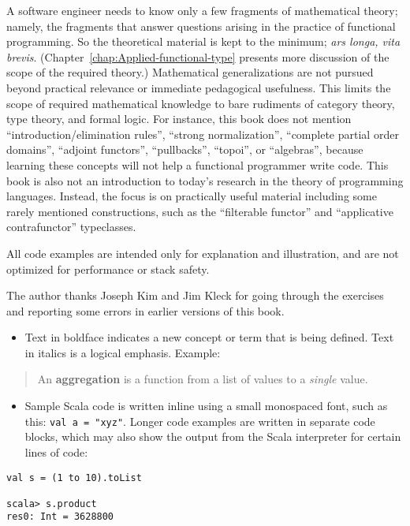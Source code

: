 A software engineer needs to know only a few fragments of mathematical
theory; namely, the fragments that answer questions arising in the
practice of functional programming. So the theoretical material is
kept to the minimum; \emph{ars longa, vita brevis}. (Chapter~\ref{chap:Applied-functional-type}
presents more discussion of the scope of the required theory.) Mathematical
generalizations are not pursued beyond practical relevance or immediate
pedagogical usefulness. This limits the scope of required mathematical
knowledge to bare rudiments of category theory, type theory, and formal
logic. For instance, this book does not mention ``introduction/elimination
rules'', ``strong normalization'', ``complete partial order domains'',
``adjoint functors'', ``pullbacks'', ``topoi'', or ``algebras'',
because learning these concepts will not help a functional programmer
write code. This book is also not an introduction to today's research
in the theory of programming languages. Instead, the focus is on practically
useful material \textendash{} including some rarely mentioned constructions,
such as the ``filterable functor'' and ``applicative contrafunctor''
typeclasses. 

All code examples are intended only for explanation and illustration,
and are not optimized for performance or stack safety.

The author thanks Joseph Kim and Jim Kleck for going through the exercises
and reporting some errors in earlier versions of this book.

\begin{itemize}
\item Text in boldface indicates a new concept or term that is being defined.
Text in italics is a logical emphasis. Example:
\end{itemize}
\begin{quotation}
An \textbf{aggregation} is a function from a list
of values to a \emph{single} value.
\end{quotation}
\begin{itemize}
\item Sample Scala code is written inline using a small monospaced font,
such as this: \lstinline!val a = "xyz"!. Longer code examples are
written in separate code blocks, which may also show the output from
the Scala interpreter for certain lines of code:
\end{itemize}
\begin{lstlisting}[mathescape=true]
val s = (1 to 10).toList

scala> s.product
res0: Int = 3628800 
\end{lstlisting}


